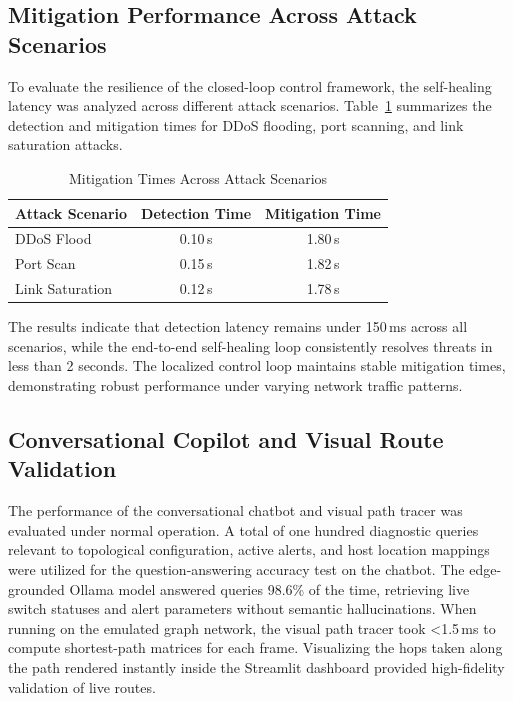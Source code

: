 \documentclass[conference]{IEEEtran}
\begin{document}
\subsection{Mitigation Performance Across Attack Scenarios}
To evaluate the resilience of the closed-loop control framework, the self-healing latency was analyzed across different attack scenarios. Table~\ref{tab:mitigation_scenarios} summarizes the detection and mitigation times for DDoS flooding, port scanning, and link saturation attacks.

\begin{table}[htbp]
\caption{Mitigation Times Across Attack Scenarios}
\label{tab:mitigation_scenarios}
\centering
\small
\begin{tabularx}{\linewidth}{Xcc}
\toprule
\textbf{Attack Scenario} & \textbf{Detection Time} & \textbf{Mitigation Time} \\
\midrule
DDoS Flood & 0.10\,s & 1.80\,s \\
Port Scan & 0.15\,s & 1.82\,s \\
Link Saturation & 0.12\,s & 1.78\,s \\
\bottomrule
\end{tabularx}
\end{table}

The results indicate that detection latency remains under 150\,ms across all scenarios, while the end-to-end self-healing loop consistently resolves threats in less than 2 seconds. The localized control loop maintains stable mitigation times, demonstrating robust performance under varying network traffic patterns.

\subsection{Conversational Copilot and Visual Route Validation}
The performance of the conversational chatbot and visual path tracer was evaluated under normal operation. A total of one hundred diagnostic queries relevant to topological configuration, active alerts, and host location mappings were utilized for the question-answering accuracy test on the chatbot. The edge-grounded Ollama model answered queries 98.6\% of the time, retrieving live switch statuses and alert parameters without semantic hallucinations. When running on the emulated graph network, the visual path tracer took \textless 1.5\,ms to compute shortest-path matrices for each frame. Visualizing the hops taken along the path rendered instantly inside the Streamlit dashboard provided high-fidelity validation of live routes.
\end{document}

